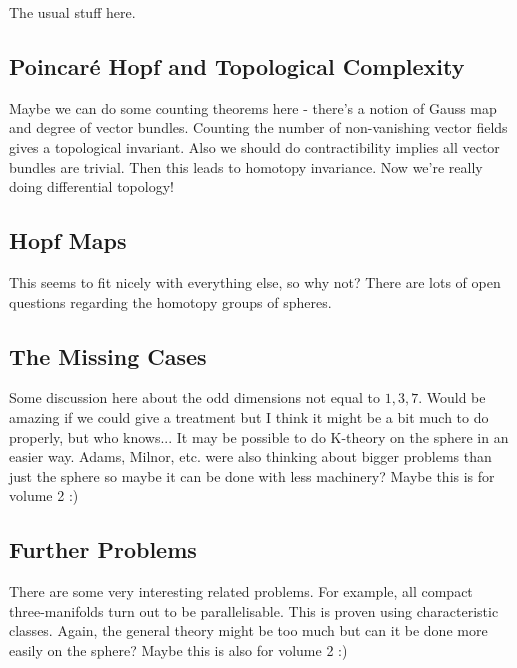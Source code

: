 The usual stuff here.


\subsection{Poincar\'e Hopf and Topological Complexity}

Maybe we can do some counting theorems here - there's a notion of Gauss map and degree of vector bundles. Counting the number of non-vanishing vector fields gives a topological invariant. Also we should do contractibility implies all vector bundles are trivial. Then this leads to homotopy invariance. Now we're really doing differential topology!

\subsection{Hopf Maps}

This seems to fit nicely with everything else, so why not? There are lots of open questions regarding the homotopy groups of spheres.

\subsection{The Missing Cases}

Some discussion here about the odd dimensions not equal to $1,3,7$. Would be amazing if we could give a treatment but I think it might be a bit much to do properly, but who knows... It may be possible to do K-theory on the sphere in an easier way. Adams, Milnor, etc. were also thinking about bigger problems than just the sphere so maybe it can be done with less machinery? Maybe this is for volume 2 :)

\subsection{Further Problems}

There are some very interesting related problems. For example, all compact three-manifolds turn out to be parallelisable. This is proven using characteristic classes. Again, the general theory might be too much but can it be done more easily on the sphere? Maybe this is also for volume 2 :)

\clearpage